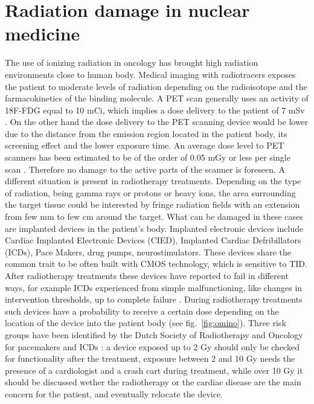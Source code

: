 \documentclass[twoside,a4paper]{article}
\begin{document}
\section{Radiation damage in nuclear medicine}

The use of ionizing radiation in oncology has brought high radiation environments close to human body. Medical imaging with radiotracers exposes the patient to moderate levels of radiation depending on the radioisotope and the farmacokinetics of the binding molecule. A PET scan generally uses an activity of 18F-FDG equal to 10 mCi, which implies a dose delivery to the patient of 7 mSv \cite{ICRP}.
On the other hand the dose delivery to the PET scanning device would be lower due to the distance from the emission region located in the patient body, its screening effect and the lower exposure time. An average dose level to PET scanners has been estimated to be of the order of 0.05 mGy or less per single scan \cite{18f}. Therefore no damage to the active parts of the scanner is foreseen.
A different situation is present in radiotherapy treatments. Depending on the type of radiation, being gamma rays or protons or heavy ions, the area surrounding the target tissue could be interested by fringe radiation fields with an extension from few mm to few cm around the target. What can be damaged in these cases are implanted devices in the patient's body.
Implanted electronic devices include Cardiac Implanted Electronic Devices (CIED), Implanted Cardiac Defribillators (ICDs), Pace Makers, drug pumps, neurostimulators. These devices share the common trait to be often built with CMOS technology, which is sensitive to TID. After radiotherapy treatments these devices have reported to fail in different ways, for example  ICDs experienced from simple malfunctioning, like changes in intervention thresholds, up to complete failure  \cite{dutch}. During radiotherapy treatments such devices have a probability to receive a certain dose depending on the location of the device into the patient body (see fig.~\ref{fig:omino}). Three risk groups have been identified by the Dutch Society of Radiotherapy and Oncology for pacemakers and ICDs \cite{dutch}: a device exposed up to 2 Gy should only be checked for functionality after the treatment, exposure between 2 and 10 Gy needs the presence of a cardiologist and a crash cart during treatment, while over 10 Gy it should be discussed wether the radiotherapy or the cardiac disease are the main concern for the patient, and eventually relocate the device.
\end{document}
